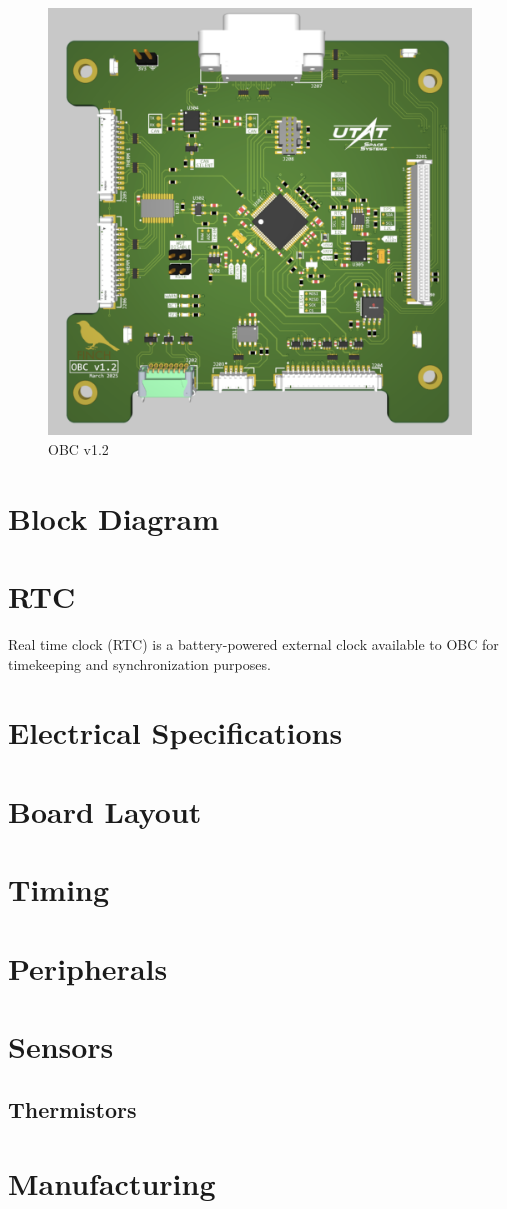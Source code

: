 \documentclass[10pt]{../datasheet}
\begin{document}
\begin{figure}[H]
  \centering
  \includegraphics[width=0.95\linewidth]{../figures/OBC_SS.png}
  \caption{\centering OBC v1.2}
  \label{fig:enter-label}
\end{figure}

\onecolumn
\section{Block Diagram}

\section{RTC}

Real time clock (RTC) is a battery-powered external clock available to OBC for
timekeeping and synchronization purposes.

\section{Electrical Specifications}
\section{Board Layout}
\section{Timing}
\section{Peripherals}
\section{Sensors}
\subsection{Thermistors}
\section{Manufacturing}
\end{document}
